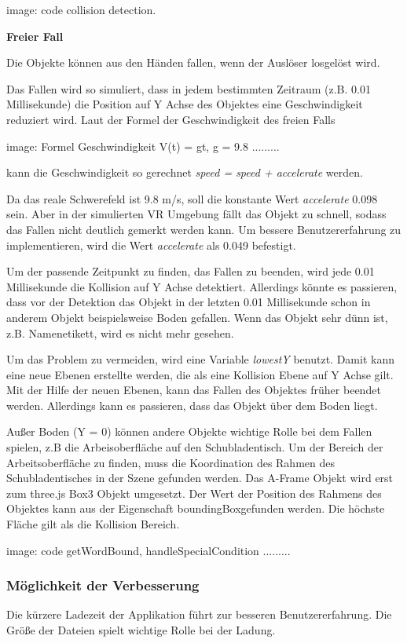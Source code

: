   image: code collision detection.
  
  \textbf{Freier Fall}
  
  Die Objekte können aus den Händen fallen, wenn der Auslöser losgelöst wird.
  
  Das Fallen wird so simuliert, dass in jedem bestimmten Zeitraum (z.B. 0.01 Millisekunde) die Position auf Y Achse des Objektes eine Geschwindigkeit reduziert wird. Laut der Formel der Geschwindigkeit des freien Falls 
  
  image: Formel Geschwindigkeit V(t) = gt, g = 9.8 .........
  
  kann die Geschwindigkeit so gerechnet \textit{speed = speed + accelerate} werden. 
  
  Da das reale Schwerefeld ist 9.8 m/s, soll die konstante Wert \textit{accelerate} 0.098 sein. Aber in der simulierten VR Umgebung fällt das Objekt zu schnell, sodass das Fallen nicht deutlich gemerkt werden kann. Um bessere Benutzererfahrung zu implementieren, wird die Wert \textit{accelerate} als 0.049 befestigt.
  
  Um der passende Zeitpunkt zu finden, das Fallen zu beenden, wird jede 0.01 Millisekunde die Kollision auf Y Achse detektiert. Allerdings könnte es passieren, dass vor der Detektion das Objekt in der letzten 0.01 Millisekunde schon in anderem Objekt beispielsweise Boden gefallen. Wenn das Objekt sehr dünn ist, z.B. Namenetikett, wird es nicht mehr gesehen.
  
  Um das Problem zu vermeiden, wird eine Variable \textit{lowestY} benutzt. Damit kann eine neue Ebenen erstellte werden, die als eine Kollision Ebene auf Y Achse gilt. Mit der Hilfe der neuen Ebenen, kann das Fallen des Objektes früher beendet werden. Allerdings kann es passieren, dass das Objekt über dem Boden liegt.
  
  Außer Boden (Y = 0) können andere Objekte wichtige Rolle bei dem Fallen spielen, z.B die Arbeisoberfläche auf den Schubladentisch. Um der Bereich der Arbeitsoberfläche zu finden, muss die Koordination des Rahmen des Schubladentisches in der Szene gefunden werden. Das A-Frame Objekt wird erst zum three.js Box3 Objekt umgesetzt. Der Wert der Position des Rahmens des Objektes kann aus der Eigenschaft \glqq boundingBox\grqq gefunden werden. Die höchste Fläche gilt als die Kollision Bereich.
  
  image: code getWordBound, handleSpecialCondition .........
  
  \subsubsection{Möglichkeit der Verbesserung}
  Die kürzere Ladezeit der Applikation führt zur besseren Benutzererfahrung. Die Größe der Dateien spielt wichtige Rolle bei der Ladung.
  
